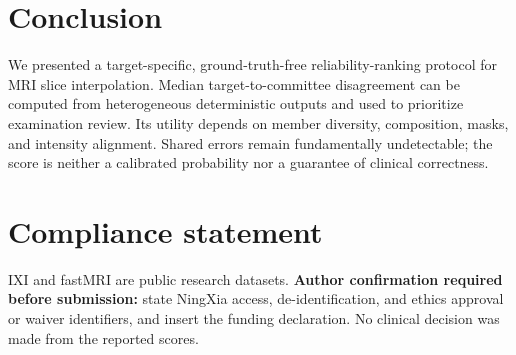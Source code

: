 \documentclass{article}
\begin{document}
\section{Conclusion}
We presented a target-specific, ground-truth-free reliability-ranking protocol for MRI slice interpolation. Median target-to-committee disagreement can be computed from heterogeneous deterministic outputs and used to prioritize examination review. Its utility depends on member diversity, composition, masks, and intensity alignment. Shared errors remain fundamentally undetectable; the score is neither a calibrated probability nor a guarantee of clinical correctness.

\clearpage
\section*{Compliance statement}
IXI and fastMRI are public research datasets. \textbf{Author confirmation required before submission:} state NingXia access, de-identification, and ethics approval or waiver identifiers, and insert the funding declaration. No clinical decision was made from the reported scores.



\end{document}
